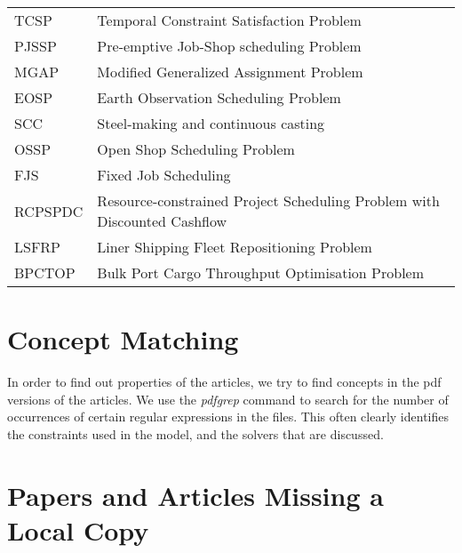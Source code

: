 \documentclass[a4paper]{article}
\begin{document}
\begin{table}[htbp]
{\begin{tabular}{lp{8cm}}
TCSP & Temporal Constraint Satisfaction Problem\\
PJSSP & Pre-emptive Job-Shop scheduling Problem\\
MGAP & Modified Generalized Assignment Problem\\
EOSP & Earth Observation Scheduling Problem \\
SCC & Steel-making and continuous casting \\
OSSP & Open Shop Scheduling Problem\\
FJS & Fixed Job Scheduling\\
RCPSPDC & Resource-constrained Project Scheduling Problem with Discounted Cashflow \\
LSFRP & Liner Shipping Fleet Repositioning Problem\\
BPCTOP & Bulk Port Cargo Throughput Optimisation Problem\\

\bottomrule
\end{tabular}
}
\end{table}



\clearpage
\section{Concept Matching}

In order to find out properties of the articles, we try to find concepts in the pdf versions of the articles. We use the \emph{pdfgrep} command to search for the number of occurrences of certain regular expressions in the files. This often clearly identifies the constraints used in the model, and the solvers that are discussed.














\clearpage





\appendix
\clearpage
\section{Papers and Articles Missing a Local Copy}
\end{document}

